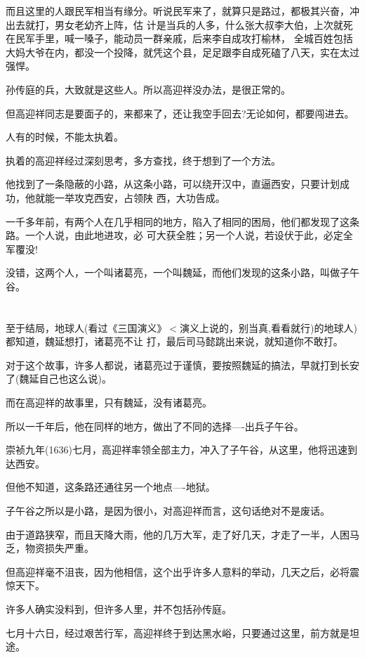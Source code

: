 \documentclass[11pt,a4paper,onecolumn]{article}
\begin{document}
而且这里的人跟民军相当有缘分。听说民军来了，就算只是路过，都极其兴奋，冲出去就打，男女老幼齐上阵，估
计是当兵的人多，什么张大叔李大伯，上次就死在民军手里，喊一嗓子，能动员一群亲戚，后来李自成攻打榆林，
全城百姓包括大妈大爷在内，都没一个投降，就凭这个县，足足跟李自成死磕了八天，实在太过强悍。

孙传庭的兵，大致就是这些人。所以高迎祥没办法，是很正常的。

但高迎祥同志是要面子的，来都来了，还让我空手回去?无论如何，都要闯进去。

人有的时候，不能太执着。

执着的高迎祥经过深刻思考，多方查找，终于想到了一个方法。

他找到了一条隐蔽的小路，从这条小路，可以绕开汉中，直逼西安，只要计划成功，他就能一举攻克西安，占领陕
西，大功告成。

一千多年前，有两个人在几乎相同的地方，陷入了相同的困局，他们都发现了这条路。一个人说，由此地进攻，必
可大获全胜；另一个人说，若设伏于此，必定全军覆没!

没错，这两个人，一个叫诸葛亮，一个叫魏延，而他们发现的这条小路，叫做子午谷。

\section[\thesection]{}

至于结局，地球人(看过《三国演义》$<$演义上说的，别当真,看看就行)的地球人)都知道，魏延想打，诸葛亮不让
打，最后司马懿跳出来说，就知道你不敢打。

对于这个故事，许多人都说，诸葛亮过于谨慎，要按照魏延的搞法，早就打到长安了(魏延自己也这么说)。

而在高迎祥的故事里，只有魏延，没有诸葛亮。

所以一千年后，他在同样的地方，做出了不同的选择----出兵子午谷。

崇祯九年(1636)七月，高迎祥率领全部主力，冲入了子午谷，从这里，他将迅速到达西安。

但他不知道，这条路还通往另一个地点----地狱。

子午谷之所以是小路，是因为很小，对高迎祥而言，这句话绝对不是废话。

由于道路狭窄，而且天降大雨，他的几万大军，走了好几天，才走了一半，人困马乏，物资损失严重。

但高迎祥毫不沮丧，因为他相信，这个出乎许多人意料的举动，几天之后，必将震惊天下。

许多人确实没料到，但许多人里，并不包括孙传庭。

七月十六日，经过艰苦行军，高迎祥终于到达黑水峪，只要通过这里，前方就是坦途。
\end{document}
